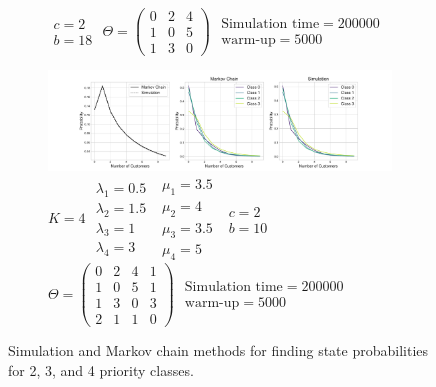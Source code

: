 \documentclass{article}
\begin{document}
\begin{figure}[h!]
\begin{center}
\begin{subfigure}[b]{\textwidth}
{        $\begin{array}{c}c=2\\b=18\end{array}$
        $\Theta = \begin{pmatrix}0 & 2 & 4\\1 & 0 & 5\\1 & 3 & 0\end{pmatrix}$
        $\begin{array}{c}\text{Simulation time} = 200000\\\text{warm-up} = 5000\end{array}$
    }
  \end{subfigure}
  \vspace{3mm}
  \begin{subfigure}[b]{\textwidth}
    \includegraphics[width=\textwidth]{img/appendix_4class.pdf}
    \caption{
        $K = 4$
        $\begin{array}{c}\lambda_1 = 0.5\\\lambda_2 = 1.5\\\lambda_3 = 1\\\lambda_4 = 3\end{array}$
        $\begin{array}{c}\mu_1 = 3.5\\\mu_2 = 4\\\mu_3 = 3.5\\\mu_4 = 5\end{array}$
        $\begin{array}{c}c=2\\b=10\end{array}$
        $\Theta = \begin{pmatrix}0 & 2 & 4 & 1\\1 & 0 & 5 & 1\\1 & 3 & 0 & 3\\2 & 1 & 1 & 0\end{pmatrix}$
        $\begin{array}{c}\text{Simulation time} = 200000\\\text{warm-up} = 5000\end{array}$
    }
  \end{subfigure}
  \caption{Simulation and Markov chain methods for finding state probabilities
  for 2, 3, and 4 priority classes.}
  \end{center}
\end{figure}
\end{document}
